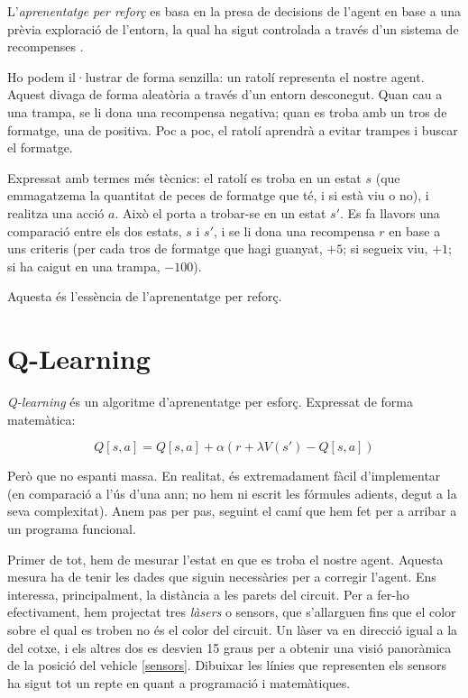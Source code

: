 L'\emph{aprenentatge per reforç} es basa en la presa de decisions de l'agent en base
a una prèvia exploració de l'entorn, la qual ha sigut controlada a través d'un sistema
de recompenses \cite{reinflnbk}.

Ho podem il·lustrar de forma senzilla: un ratolí representa el nostre agent. Aquest divaga
de forma aleatòria a través d'un entorn desconegut. Quan cau a una trampa, se li dona una
recompensa negativa; quan es troba amb un tros de formatge, una de positiva. Poc a poc,
el ratolí aprendrà a evitar trampes i buscar el formatge.

Expressat amb termes més tècnics: el ratolí es troba en un estat \(s\) (que
emmagatzema la quantitat de peces de formatge que té, i si està viu o no), i
realitza una acció \(a\). Això el porta a trobar-se en un estat \(s'\).
Es fa llavors una comparació entre els dos estats, \(s\) i \(s'\), i se
li dona una recompensa \(r\) en base a uns criteris (per cada tros de formatge
que hagi guanyat, \(+5\); si segueix viu, \(+1\); si ha caigut en una trampa,
\(-100\)).

Aquesta és l'essència
de l'aprenentatge per reforç.

\section{Q-Learning}

\emph{Q-learning} és un algoritme d'aprenentatge per esforç. Expressat de forma
matemàtica:

\begin{equation} \label{eq:qlearning}
Q[s, a] = Q[s, a] + \alpha(r + \lambda V(s') - Q[s, a])
\end{equation}

Però que no espanti massa. En realitat, és extremadament fàcil d'implementar (en 
comparació a l'ús d'una \ac{ann}; no hem ni escrit les fórmules adients, degut a la seva
complexitat). Anem pas per pas, seguint el camí que hem fet per a arribar a 
un programa funcional.

Primer de tot, hem de mesurar l'estat en que es troba el nostre agent. Aquesta mesura ha de tenir les dades
que siguin necessàries per a corregir l'agent. Ens interessa, principalment, la distància
a les parets del circuit. Per a fer-ho efectivament, hem projectat tres \emph{làsers} o
sensors, que s'allarguen fins que el color sobre el qual es troben no és el color del circuit.
Un làser va en direcció igual a la del cotxe, i els altres dos es desvien 15 graus per a obtenir
una visió panoràmica de la posició del vehicle \ref{sensors}. Dibuixar les línies que
representen els sensors ha sigut tot un repte en quant a programació i matemàtiques.

